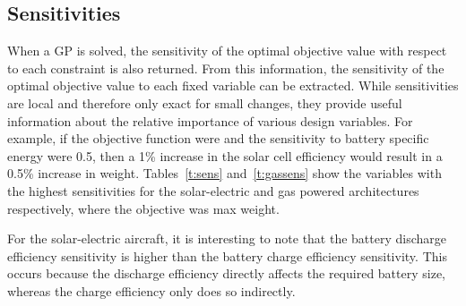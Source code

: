 \DIFdelend \subsection{Sensitivities}

When a GP is solved, the sensitivity of the optimal objective value with respect to each constraint is also returned.  
From this information, the sensitivity of the optimal objective value to each fixed variable can be extracted.\cite{hoburgthesis} 
While sensitivities are local and therefore only exact for small changes, they provide useful information about the relative importance of various design variables. 
For example, if the objective function were \DIFdelbegin {}\DIFdelend \DIFaddbegin {}\DIFaddend and the sensitivity to battery specific energy were 0.5, then a 1\% increase in the solar cell efficiency would result in a 0.5\% increase in weight.  
Tables~\ref{t:sens} and~\ref{t:gassens} show the variables with the highest sensitivities for the solar-electric and gas powered architectures respectively, where the objective was max \DIFdelbegin {}\DIFdelend \DIFaddbegin {}\DIFaddend weight.

For the solar-electric aircraft, it is interesting to note that the battery discharge efficiency sensitivity is higher than the battery charge efficiency sensitivity.
This occurs because the discharge efficiency directly affects the required battery size, whereas the charge efficiency only does so indirectly. 

\DIFdelbegin {}\DIFdelend %

